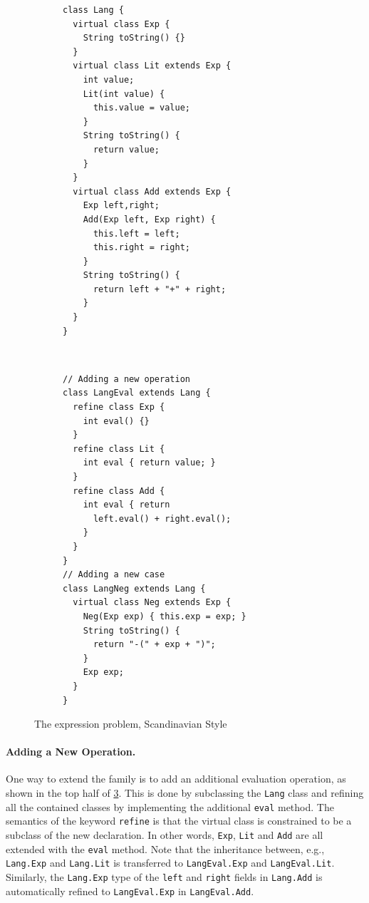 \begin{figure}[t]
    \centering
    \begin{subfigure}[b]{0.45\textwidth}
\begin{lstlisting}[language=gbeta]
class Lang {
  virtual class Exp {
    String toString() {}
  }
  virtual class Lit extends Exp {
    int value;
    Lit(int value) {
      this.value = value;
    }
    String toString() {
      return value;
    }
  }
  virtual class Add extends Exp {
    Exp left,right;
    Add(Exp left, Exp right) {
      this.left = left;
      this.right = right;
    }
    String toString() {
      return left + "+" + right;
    }
  }
}
\end{lstlisting}
 \label{fig:lang}
    \end{subfigure} ~
    \begin{subfigure}[b]{0.5\textwidth}
\begin{lstlisting}[language=gbeta,  xleftmargin=1mm]
// Adding a new operation
class LangEval extends Lang {
  refine class Exp {
    int eval() {}
  }
  refine class Lit {
    int eval { return value; }
  }
  refine class Add {
    int eval { return
      left.eval() + right.eval();
    }
  }
}
// Adding a new case
class LangNeg extends Lang {
  virtual class Neg extends Exp {
    Neg(Exp exp) { this.exp = exp; }
    String toString() {
      return "-(" + exp + ")";
    }
    Exp exp;
  }
}
\end{lstlisting}
 \label{fig:extend}
    \end{subfigure}
    \caption{The expression problem, Scandinavian Style}
\end{figure}

\paragraph{Adding a New Operation.}

One way to extend the family is to add an additional evaluation operation, as
shown in the top half of \cref{fig:extend}. This is done by subclassing the
\lstinline{Lang} class and refining all the contained classes by implementing
the additional \lstinline{eval} method. The semantics of the keyword
\lstinline[language=gbeta]{refine} is that the virtual class is constrained to
be a subclass of the new declaration. In other words, \lstinline{Exp},
\lstinline{Lit} and \lstinline{Add} are all extended with the \lstinline{eval}
method. Note that the inheritance between, e.g., \lstinline{Lang.Exp} and
\lstinline{Lang.Lit} is transferred to \lstinline{LangEval.Exp} and
\lstinline{LangEval.Lit}. Similarly, the \lstinline{Lang.Exp} type of the
\lstinline{left} and \lstinline{right} fields in \lstinline{Lang.Add} is
automatically refined to \lstinline{LangEval.Exp} in \lstinline{LangEval.Add}.

